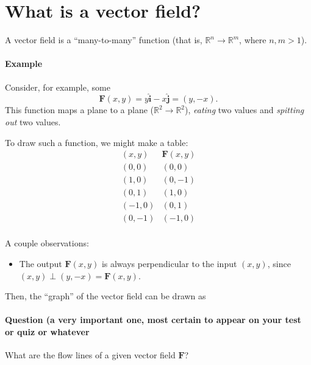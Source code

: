 \documentclass[11pt]{article}
\newcommand{\uvec}[1]{\bm{\hat{#1}}}
\renewcommand{\vec}[1]{\bm{#1}}
\newcommand{\real}{\mathbb R}
\begin{document}
\section*{What is a vector field?}

A vector field is a ``many-to-many'' function (that is, \(\mathbb R^n \to \mathbb R^m\), where \(n, m > 1\)).

\paragraph{Example}

Consider, for example, some
\[
    \vec F(x, y) = y \uvec i - x \uvec j = (y, -x).
\]
This function maps a plane to a plane (\(\real^2 \to \real^2\)), \emph{eating} two values and \emph{spitting out} two values.

To draw such a function, we might make a table:
\[
    \begin{array}{c|c}
        (x, y) & \vec F(x, y) \\ \hline
        (0, 0) & (0, 0) \\
        (1, 0) & (0, -1) \\
        (0, 1) & (1, 0) \\
        (-1, 0) & (0, 1) \\
        (0, -1) & (-1, 0) \\
    \end{array}
\]

A couple observations:
\begin{itemize}
\item The output \(\vec F(x, y)\) is always perpendicular to the input \((x, y)\), since \((x, y) \perp (y, -x) = \vec F(x, y)\).
\end{itemize}

Then, the ``graph'' of the vector field can be drawn as
\begin{center}
    \begin{tikzpicture}
        
    \end{tikzpicture}
\end{center}

\paragraph{Question (a very important one, most certain to appear on your test or quiz or whatever}

What are the flow lines of a given vector field \(\vec F\)?
\end{document}
